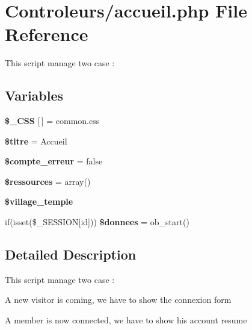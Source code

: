 \hypertarget{Controleurs_2accueil_8php}{}\section{Controleurs/accueil.php File Reference}
\label{Controleurs_2accueil_8php}


This script manage two case \+:  


\subsection*{Variables}
\begin{DoxyCompactItemize}
\item 
\mbox{\label{Controleurs_2accueil_8php_a60af369bff01e56fc0bf0677a6dff6cb}} 
{\bfseries \$\+\_\+\+C\+SS} \mbox{[}$\,$\mbox{]} = \textquotesingle{}common.\+css\textquotesingle{}
\item 
\mbox{\label{Controleurs_2accueil_8php_a43e5b5a819fedbd12b8cf5421ba6985e}} 
{\bfseries \$titre} = \textquotesingle{}Accueil\textquotesingle{}
\item 
\mbox{\label{Controleurs_2accueil_8php_a1f34850a79fa25c790cf4189ff494b62}} 
{\bfseries \$compte\+\_\+erreur} = false
\item 
\mbox{\label{Controleurs_2accueil_8php_a90495ba52b30420e55824e8e1881b74a}} 
{\bfseries \$ressources} = array()
\item 
\mbox{\label{Controleurs_2accueil_8php_a07a6a7957392eb99bec9d29e0ccc40e0}} 
{\bfseries \$village\+\_\+temple}
\item 
\mbox{\label{Controleurs_2accueil_8php_a48d38ace588939a7197483e7911bc336}} 
if(isset(\$\+\_\+\+S\+E\+S\+S\+I\+ON\mbox{[}\textquotesingle{}id\textquotesingle{}\mbox{]})) {\bfseries \$donnees} = ob\+\_\+start()
\end{DoxyCompactItemize}


\subsection{Detailed Description}
This script manage two case \+: 


\begin{DoxyEnumerate}
\item A new visitor is coming, we have to show the connexion form
\item A member is now connected, we have to show his account resume 
\end{DoxyEnumerate}